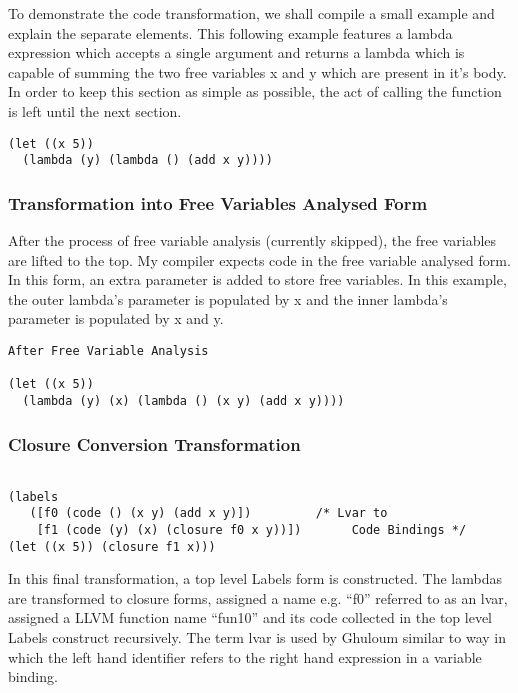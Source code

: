 \documentclass{article}
\begin{document}
To demonstrate the code transformation, we shall compile a small example and explain the separate elements. This following example features a lambda expression which accepts a single argument and returns a lambda which is capable of summing the two free variables x and y which are present in it's body. In order to keep this section as simple as possible, the act of calling the function is left until the next section.

\begin{verbatim}
(let ((x 5))
  (lambda (y) (lambda () (add x y))))
\end{verbatim}

\subsubsection{Transformation into Free Variables Analysed Form}

After the process of free variable analysis (currently skipped), the free variables are lifted to the top. My compiler expects code in the free variable analysed form. In this form, an extra parameter is added to store free variables. In this example, the outer lambda's parameter is populated by x and the inner lambda's parameter is populated by x and y. 

\begin{verbatim}
After Free Variable Analysis

(let ((x 5))
  (lambda (y) (x) (lambda () (x y) (add x y))))
\end{verbatim}

\subsubsection{Closure Conversion Transformation}

\begin{verbatim}

(labels 
   ([f0 (code () (x y) (add x y)])         /* Lvar to 
    [f1 (code (y) (x) (closure f0 x y))])       Code Bindings */
(let ((x 5)) (closure f1 x)))
\end{verbatim}

In this final transformation, a top level Labels form is constructed. The lambdas are transformed to closure forms, assigned a name e.g. ``f0'' referred to as an lvar, assigned a LLVM function name ``fun10'' and its code collected in the top level Labels construct recursively. The term lvar is used by Ghuloum similar to way in which the left hand identifier refers to the right hand expression in a variable binding.
\end{document}
